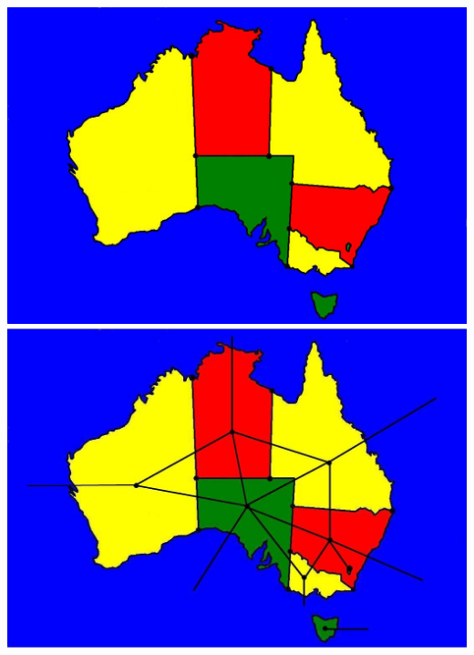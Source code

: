 \sf\coursetitle
\np\lecturetitle
\newpage\lecturetitleviii
\newpage\includegraphics[width=\linewidth,height=\textheight,angle=180]{Australia.eps}
\newpage\includegraphics[width=\linewidth,height=\textheight,angle=180]{Australia2.eps}
\newpage\lectviiia
